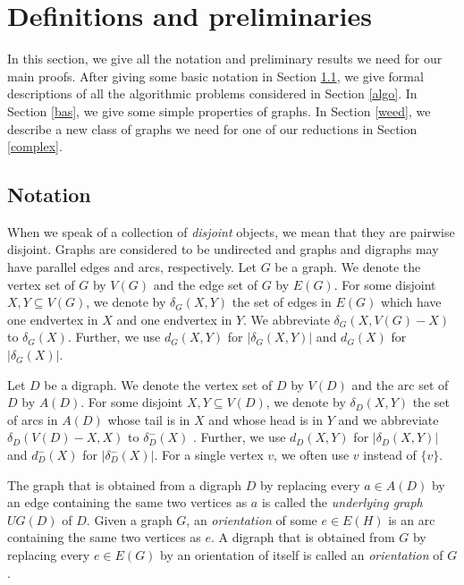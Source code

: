 \documentclass{article}
\begin{document}
\section{Definitions and preliminaries}\label{preldef}
In this section, we give all the notation and preliminary results we need for our main proofs. After giving some basic notation in Section \ref{nota}, we give formal descriptions of all the algorithmic problems considered in Section \ref{algo}. In Section \ref{bas}, we give some simple properties of graphs. In Section \ref{weed}, we describe a new class of graphs we need for one of our reductions in Section \ref{complex}.
\subsection{Notation}\label{nota}
When we speak of a collection of {\it disjoint} objects, we mean that they are pairwise disjoint.
Graphs are considered to be undirected and graphs and digraphs may have parallel edges and arcs, respectively. Let $G$ be a graph. We denote the vertex set of $G$ by $V(G)$ and the edge set of $G$ by $E(G)$. For some disjoint $X,Y \subseteq V(G)$, we denote by $\delta_G(X,Y)$ the set of edges in $E(G)$ which have one endvertex in $X$ and one endvertex in $Y$. We abbreviate $\delta_G(X,V(G)-X)$ to $\delta_G(X)$. Further, we use $d_G(X,Y)$ for $|\delta_G(X,Y)|$ and $d_G(X)$ for $|\delta_G(X)|$. 

Let $D$ be a digraph. We denote the vertex set of $D$ by $V(D)$ and the arc set of $D$ by $A(D)$. For some disjoint $X,Y \subseteq V(D)$, we denote by $\delta_D(X,Y)$ the set of arcs in $A(D)$ whose tail is in $X$ and whose head is in $Y$ and we abbreviate $\delta_D(V(D)-X,X)$ to $\delta_D^-(X)$ . Further, we use $d_D(X,Y)$ for $|\delta_D(X,Y)|$ and $d_D^-(X)$ for $|\delta_D^-(X)|$. For a single vertex $v$, we often use $v$ instead of $\{v\}$.%

 The graph that is obtained from a digraph $D$ by replacing every $a \in A(D)$ by an edge containing the same two vertices as $a$ is called the {\it underlying graph} $UG(D)$ of $D$. Given a graph $G$, an {\it orientation} of some $e \in E(H)$ is an arc containing the same two vertices as $e$. A digraph that is obtained from $G$ by replacing every $e \in E(G)$ by an orientation of itself is called an {\it orientation} of $G$.
\end{document}
